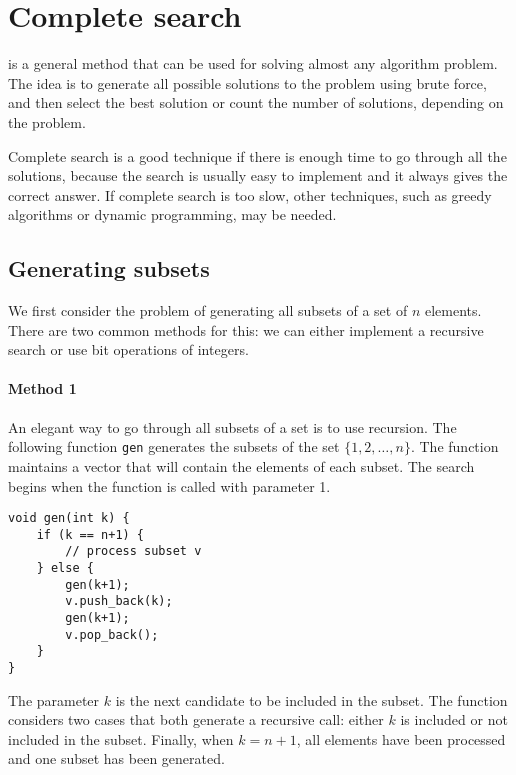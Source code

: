 \chapter{Complete search}

is a general method that can be used
for solving almost any algorithm problem.
The idea is to generate all possible
solutions to the problem using brute force,
and then select the best solution or count the
number of solutions, depending on the problem.

Complete search is a good technique
if there is enough time to go through all the solutions,
because the search is usually easy to implement
and it always gives the correct answer.
If complete search is too slow,
other techniques, such as greedy algorithms or
dynamic programming, may be needed.

\section{Generating subsets}


We first consider the problem of generating
all subsets of a set of $n$ elements.
There are two common methods for this:
we can either implement a recursive search
or use bit operations of integers.

\subsubsection{Method 1}

An elegant way to go through all subsets
of a set is to use recursion.
The following function \texttt{gen}
generates the subsets of the set
$\{1,2,\ldots,n\}$.
The function maintains a vector
that will contain the elements of each subset.
The search begins when the function is called
with parameter 1.

\begin{lstlisting}
void gen(int k) {
    if (k == n+1) {
        // process subset v
    } else {
        gen(k+1);
        v.push_back(k);
        gen(k+1);
        v.pop_back();
    }
}
\end{lstlisting}

The parameter $k$ is the next
candidate to be included in the subset.
The function considers two cases that both
generate a recursive call:
either $k$ is included or not included in the subset.
Finally, when $k=n+1$, all elements have been processed
and one subset has been generated.

